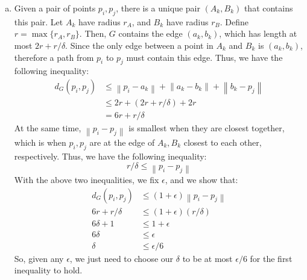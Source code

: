\documentclass{article}
\newcommand{\norm}[1]{\left\lVert#1\right\rVert}
\begin{document}
\begin{enumerate}[(a)]
\item Given a pair of points $p_i, p_j$, there is a unique pair $(A_k, B_k)$ that contains this pair. Let $A_k$ have radius $r_A$, and $B_k$ have radius $r_B$. Define $r = \max\{r_A, r_B\}$. Then, $G$ contains the edge $(a_k, b_k)$, which has length at most $2r+r/\delta$. Since the only edge between a point in $A_k$ and $B_k$ is $(a_k, b_k)$, therefore a path from $p_i$ to $p_j$ must contain this edge. Thus, we have the following inequality:
\begin{align*}
d_G(p_i,p_j) &\leq \norm{p_i-a_k} + \norm{a_k-b_k} + \norm{b_k - p_j} \\
&\leq 2r+ (2r + r/\delta) + 2r \\
&= 6r + r/\delta
\end{align*}
At the same time, $\norm{p_i-p_j}$ is smallest when they are closest together, which is when $p_i,p_j$ are at the edge of $A_k, B_k$ closest to each other, respectively. Thus, we have the following inequality:
$$r/\delta \leq \norm{p_i-p_j}$$
With the above two inequalities, we fix $\epsilon$, and we show that:
\begin{align*}
d_G(p_i, p_j)&\leq (1+\epsilon)\norm{p_i-p_j} \\
6r+r/\delta &\leq (1+\epsilon)(r/\delta) \\
6\delta + 1 & \leq 1+\epsilon \\
6\delta &\leq \epsilon \\
\delta & \leq \epsilon/6
\end{align*}
So, given any $\epsilon$, we just need to choose our $\delta$ to be at most $\epsilon/6$ for the first inequality to hold.
\end{enumerate}

\pagebreak
\end{document}
